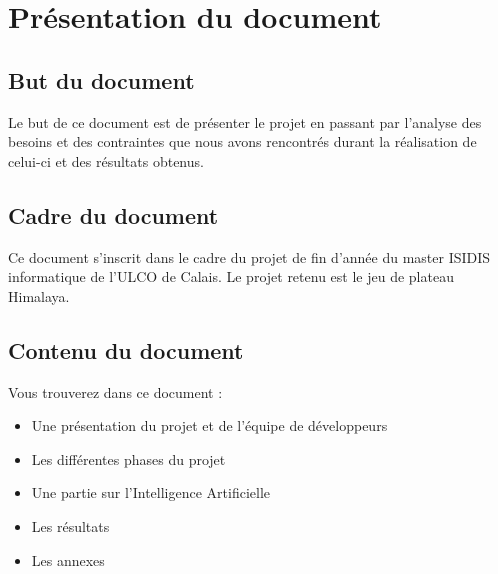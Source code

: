 \documentclass[french]{scrartcl}
\begin{document}
	\newpage
	
	
	
	\newpage
	\section{Présentation du document}
		\subsection{But du document}
		Le but de ce document est de présenter le projet en passant par l'analyse des besoins et des contraintes que nous avons rencontrés durant la réalisation de celui-ci et des résultats obtenus.
		\subsection{Cadre du document}
		Ce document s’inscrit dans le cadre du projet de fin d’année du master ISIDIS informatique de l’ULCO de Calais. Le projet retenu est le jeu de plateau Himalaya.
		\subsection{Contenu du document}
		Vous trouverez dans ce document : 
		\begin{itemize}
			\item Une présentation du projet et de l’équipe de développeurs 
			\item Les différentes phases du projet
			\item Une partie sur l'Intelligence Artificielle
			\item Les résultats
			\item Les annexes 
		\end{itemize}
		
	
	\newpage
	
	
	
	\newpage
	
	
	
	
	
	
	\newpage
	
	
	\newpage
	
	
	\newpage
	
	
\end{document}
